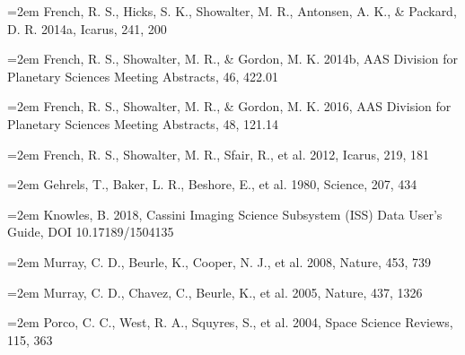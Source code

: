 \noindent\hangindent=2em French, R. S., Hicks, S. K., Showalter, M. R., Antonsen, A. K., \& Packard, D. R. 2014a, Icarus, 241, 200

\noindent\hangindent=2em French, R. S., Showalter, M. R., \& Gordon, M. K. 2014b, AAS Division for Planetary Sciences Meeting Abstracts, 46, 422.01

\noindent\hangindent=2em French, R. S., Showalter, M. R., \& Gordon, M. K. 2016, AAS Division for Planetary Sciences Meeting Abstracts, 48, 121.14

\noindent\hangindent=2em French, R. S., Showalter, M. R., Sfair, R., et al. 2012, Icarus, 219, 181

\noindent\hangindent=2em Gehrels, T., Baker, L. R., Beshore, E., et al. 1980, Science, 207, 434

\noindent\hangindent=2em Knowles, B. 2018, Cassini Imaging Science Subsystem (ISS) Data User’s Guide, DOI 10.17189/1504135

\noindent\hangindent=2em Murray, C. D., Beurle, K., Cooper, N. J., et al. 2008, Nature, 453, 739

\noindent\hangindent=2em Murray, C. D., Chavez, C., Beurle, K., et al. 2005, Nature, 437, 1326

\noindent\hangindent=2em Porco, C. C., West, R. A., Squyres, S., et al. 2004, Space Science Reviews, 115, 363
